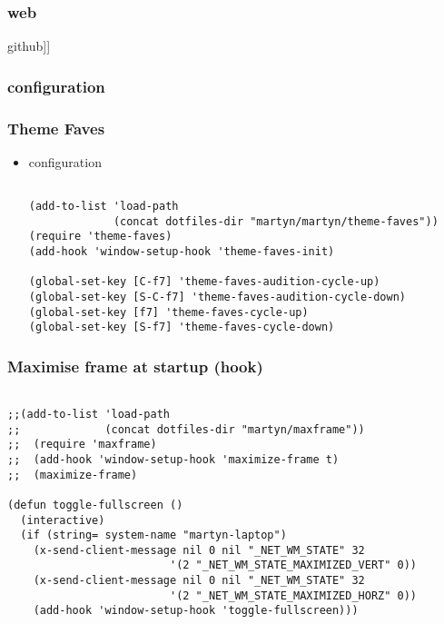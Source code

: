 \documentclass[colorlinks=true,urlcolor=blue,listings-sv]{article}
\begin{document}
\subsubsection{web}
\label{sec-1-15-2}


github]]
\subsubsection{configuration}
\label{sec-1-15-3}
\subsubsection{Theme Faves}
\label{sec-1-15-4}
\begin{itemize}

\item configuration\\
\label{sec-1-15-4-1}%
\lstset{language=Lisp}
\begin{lstlisting}

(add-to-list 'load-path
             (concat dotfiles-dir "martyn/martyn/theme-faves"))
(require 'theme-faves)
(add-hook 'window-setup-hook 'theme-faves-init)

(global-set-key [C-f7] 'theme-faves-audition-cycle-up)
(global-set-key [S-C-f7] 'theme-faves-audition-cycle-down)
(global-set-key [f7] 'theme-faves-cycle-up)
(global-set-key [S-f7] 'theme-faves-cycle-down)
\end{lstlisting}

\end{itemize} %
\subsubsection{Maximise frame at startup (hook)}
\label{sec-1-15-5}
\label{5ec698bf-0dcd-4b19-b923-a5f90e5a1073}



\lstset{language=Lisp}
\begin{lstlisting}

;;(add-to-list 'load-path
;;             (concat dotfiles-dir "martyn/maxframe"))
;;  (require 'maxframe)
;;  (add-hook 'window-setup-hook 'maximize-frame t)
;;  (maximize-frame)

(defun toggle-fullscreen ()
  (interactive)
  (if (string= system-name "martyn-laptop")
    (x-send-client-message nil 0 nil "_NET_WM_STATE" 32
                         '(2 "_NET_WM_STATE_MAXIMIZED_VERT" 0))
    (x-send-client-message nil 0 nil "_NET_WM_STATE" 32
                         '(2 "_NET_WM_STATE_MAXIMIZED_HORZ" 0))
    (add-hook 'window-setup-hook 'toggle-fullscreen)))
\end{lstlisting}
\end{document}
